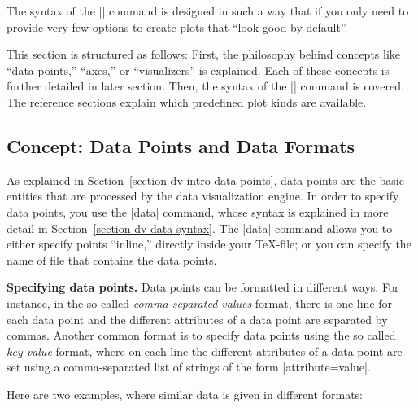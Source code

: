 The syntax of the |\datavisualization| command is designed in such a
way that if you only need to provide very few options to create plots
that ``look good by default''.

This section is structured as follows: First, the philosophy behind
concepts like ``data points,'' ``axes,'' or ``visualizers'' is
explained. Each of these concepts is further detailed in later
section. Then, the syntax of the |\datavisualization| command is
covered. The reference sections explain which predefined plot kinds
are available.


\subsection{Concept: Data Points and Data Formats}

As explained in Section~\ref{section-dv-intro-data-points}, data
points are the basic entities that are processed by the data
visualization engine. In order to specify data points, you use the
|data| command, whose syntax is explained in more detail in
Section~\ref{section-dv-data-syntax}. The |data| command allows you to
either specify points ``inline,'' directly inside your \TeX-file; or
you can specify the name of file that contains the data points.

\medskip
\textbf{Specifying data points.}
Data points can be formatted in different ways. For instance, in the so
called \emph{comma separated values} format, there is one line for
each data point and the different attributes of a data point are
separated by commas. Another common format is to specify data points
using the so called \emph{key-value} format, where on each line the
different attributes of a data point are set using a comma-separated
list of strings of the form |attribute=value|.

Here are two examples, where similar data is given in different
formats:

    \begin{codeexample}[]
    \end{codeexample}

    \begin{codeexample}[]
    \end{codeexample}

